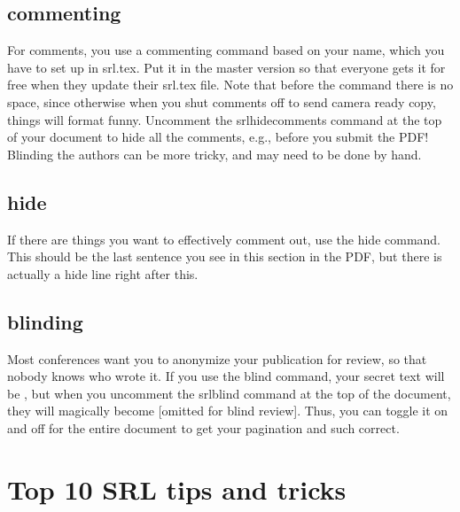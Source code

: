 \documentclass{sigchi}
\begin{document}
\subsection{commenting}
For comments, you use a commenting command based on your name, which you have to set up in srl.tex.
Put it in the master version so that everyone gets it for free when they update their srl.tex file.
Note that before the command there is no space, since otherwise when you shut comments off to send camera ready copy, things will format funny.
Uncomment the srlhidecomments command at the top of your document to hide all the comments, e.g., before you submit the PDF!
Blinding the authors can be more tricky, and may need to be done by hand.

\subsection{hide}
If there are things you want to effectively comment out, use the hide command.
This should be the last sentence you see in this section in the PDF, but there is actually a hide line right after this.

\subsection{blinding}
Most conferences want you to anonymize your publication for review, so that nobody knows who wrote it.
If you use the blind command, your secret text will be , but when you uncomment the srlblind command at the top of the document, they will magically become [omitted for blind review].
Thus, you can toggle it on and off for the entire document to get your pagination and such correct.

\section{Top 10 SRL tips and tricks}
\end{document}
